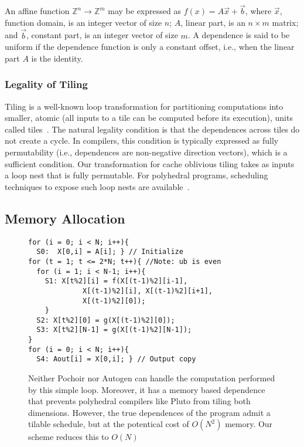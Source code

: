 An affine function $\mathbb{Z}^n \rightarrow \mathbb{Z}^m$ may be expressed as
$f(x) = A\vec{x} + \vec{b}$, where $\vec{x}$, function domain, is an integer
vector of size $n$; $A$, linear part, is an $n\times m$ matrix; and $\vec{b}$,
constant part, is an integer vector of size $m$.  A dependence is said to be
uniform if the dependence function is only a constant offset, i.e., when the
linear part $A$ is the identity.


\subsubsection{Legality of Tiling}

Tiling is a well-known loop transformation for partitioning computations into
smaller, atomic (all inputs to a tile can be computed before its execution),
units called tiles~\cite{irigoin-popl88, Wolf91tiling}.  The natural legality
condition is that the dependences across tiles do not create a cycle.  In
compilers, this condition is typically expressed as fully permutability (i.e.,
dependences are non-negative direction vectors), which is a sufficient
condition.  Our transformation for cache oblivious tiling takes as inputs a
loop nest that is fully permutable.  For polyhedral programs, scheduling
techniques to expose such loop nests are available~\cite{uday-pldi08}.


\subsection{Memory Allocation}

\begin{figure}[tb]
  \centering %
{\small\begin{lstlisting}
for (i = 0; i < N; i++){
  S0:  X[0,i] = A[i]; } // Initialize
for (t = 1; t <= 2*N; t++){ //Note: ub is even
  for (i = 1; i < N-1; i++){
    S1: X[t%2][i] = f(X[(t-1)%2][i-1],
             X[(t-1)%2][i], X[(t-1)%2][i+1],
             X[(t-1)%2][0]);
    }
  S2: X[t%2][0] = g(X[(t-1)%2][0]); 
  S3: X[t%2][N-1] = g(X[(t-1)%2][N-1]);
}
for (i = 0; i < N; i++){
  S4: Aout[i] = X[0,i]; } // Output copy
\end{lstlisting}
}
\caption{\small{Neither Pochoir nor Autogen can handle the computation
    performed by this simple loop.  Moreover, it has a memory based dependence
    that prevents polyhedral compilers like Pluto from tiling both dimensions.
    However, the true dependences of the program admit a tilable schedule, but
    at the potentical cost of $O(N^2)$ memory.  Our scheme reduces this to
    $O(N)$}}
\label{fig:motiv}
\end{figure}


